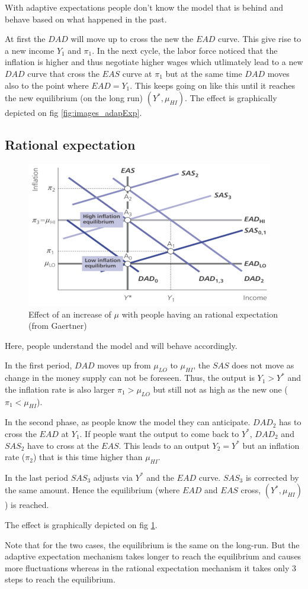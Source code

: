 \documentclass[a4paper] {scrartcl}
\begin{document}
With adaptive expectations people don't know the model that is behind and behave based on what happened in the past.

At first the $DAD$ will move up to cross the new the $EAD$ curve. This give rise to a new income $Y_1$ and $\pi_1$. In the next cycle, the labor force noticed that the inflation is higher and thus negotiate higher wages which utlimately lead to a new $DAD$ curve that cross the $EAS$ curve at $\pi_1$ but at the same time $DAD$ moves also to the point where $EAD=Y_1$. This keeps going on like this until it reaches the new equilibrium (on the long run) $(Y^*,\mu_{HI})$. The effect is graphically depicted on fig \ref{fig:images_adapExp}.


\subsection{Rational expectation}

\begin{figure}[htbp]
	\centering
		\includegraphics[height=2.5in]{images/ratExp.png}
	\caption{Effect of an increase of $\mu$ with people having an rational expectation (from Gaertner)}
	\label{fig:images_ratExp}
\end{figure}

Here, people understand the model and will behave accordingly.

In the first period, $DAD$ moves up from $\mu_{LO}$ to $\mu_{HI}$, the $SAS$ does not move as change in the money supply can not be foreseen. Thus, the output is $Y_1>Y^*$ and the inflation rate is also larger $\pi_1>\mu_{LO}$ but still not as high as the new one ($\pi_1<\mu_{HI}$).

In the second phase, as people know the model they can anticipate. $DAD_2$ has to cross the $EAD$ at $Y_1$. If people want the output to come back to $Y^*$, $DAD_2$ and $SAS_2$ have to cross at the $EAS$. This leads to an output $Y_2=Y^*$ but an inflation rate ($\pi_2$) that is this time higher than $\mu_{HI}$.

In the last period $SAS_3$ adjusts via $Y^*$ and the $EAD$ curve. $SAS_3$ is corrected by the same amount. Hence the equilibrium (where $EAD$ and $EAS$ cross, $(Y^*,\mu_{HI})$) is reached.

The effect is graphically depicted on fig \ref{fig:images_ratExp}.

Note that for the two cases, the equilibrium is the same on the long-run. But the adaptive expectation mechanism takes longer to reach the equilibrium and causes more fluctuations whereas in the rational expectation mechanism it takes only 3 steps to reach the equilibrium.
\end{document}
